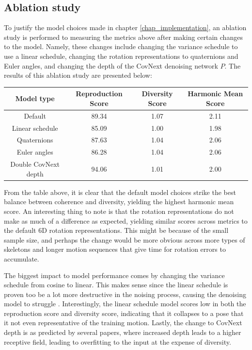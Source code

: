 \documentclass[a4paper, 12pt]{report}
\begin{document}
\subsection{Ablation study}
To justify the model choices made in chapter \ref{chap_implementation}, an ablation study is performed to measuring the metrics above after making certain changes to the model. Namely, these changes include changing the variance schedule to use a linear schedule, changing the rotation representations to quaternions and Euler angles, and changing the depth of the CovNext denoising network \(P\). The results of this ablation study are presented below:

\begin{table}[H]
	\centering
	\begin{tabular}{||c c c c||} 
		\hline
		Model type           & Reproduction Score & Diversity Score & Harmonic Mean Score \\ [0.5ex] 
		\hline\hline
		Default              & 89.34              & 1.07            & 2.11                \\ 
		Linear schedule      & 85.09              & 1.00            & 1.98                \\
		Quaternions          & 87.63              & 1.04            & 2.06                \\
		Euler angles         & 86.28              & 1.04            & 2.06                \\
		Double CovNext depth & 94.06              & 1.01            & 2.00                
		\\[1ex] 
		\hline
	\end{tabular}
\end{table}

From the table above, it is clear that the default model choices strike the best balance between coherence and diversity, yielding the highest harmonic mean score. An interesting thing to note is that the rotation representations do not make as much of a difference as expected, yielding similar scores across metrics to the default 6D rotation representations. This might be because of the small sample size, and perhaps the change would be more obvious across more types of skeletons and longer motion sequences that give time for rotation errors to accumulate. 

The biggest impact to model performance comes by changing the variance schedule from cosine to linear. This makes sense since the linear schedule is proven too be a lot more destructive in the noising process, causing the denoising model to struggle \cite{nichol_improved_2021}. Interestingly, the linear schedule model scores low in both the reproduction score and diversity score, indicating that it collapses to a pose that it not even representative of the training motion. Lastly, the change to CovNext depth is as predicted by several papers, where increased depth leads to a higher receptive field, leading to overfitting to the input at the expense of diversity. 
\end{document}
